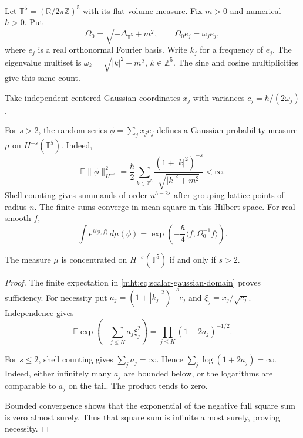 Let $\mathbb T^5=(\mathbb R/2\pi\mathbb Z)^5$ with its flat
volume measure. Fix $m>0$ and numerical $\hbar>0$. Put
\[
 \Omega_0=\sqrt{-\Delta_{\mathbb T^5}+m^2},
 \qquad \Omega_0e_j=\omega_je_j,
\]
where $e_j$ is a real orthonormal Fourier basis.
Write $k_j$ for a frequency of $e_j$.
The eigenvalue multiset is
$\omega_k=\sqrt{|k|^2+m^2}$, $k\in\mathbb Z^5$.
The sine and cosine multiplicities give this same count.

Take independent centered Gaussian coordinates $x_j$ with
variances $c_j=\hbar/(2\omega_j)$.

For $s>2$, the random series $\phi=\sum_jx_je_j$ defines
a Gaussian probability measure $\mu$ on $H^{-s}(\mathbb T^5)$.
Indeed,
\begin{equation}\label{mht:eq:scalar-gaussian-domain}
 \mathbb E\|\phi\|_{H^{-s}}^2
   =\frac\hbar2\sum_{k\in\mathbb Z^5}
       \frac{(1+|k|^2)^{-s}}{\sqrt{|k|^2+m^2}}<\infty.
\end{equation}
Shell counting gives summands of order $n^{3-2s}$ after
grouping lattice points of radius $n$. The finite sums converge
in mean square in this Hilbert space. For real smooth $f$,
\begin{equation}\label{mht:eq:scalar-characteristic-functional}
 \int e^{i\langle\phi,f\rangle}\,d\mu(\phi)
 =\exp\!\left(-\frac\hbar4
                       \langle f,\Omega_0^{-1}f\rangle\right).
\end{equation}

\begin{proposition}
\label{mht:prop:scalar-sobolev-threshold}
The measure $\mu$ is concentrated on $H^{-s}(\mathbb T^5)$
if and only if $s>2$.
\end{proposition}

\begin{proof}
The finite expectation in
\eqref{mht:eq:scalar-gaussian-domain} proves sufficiency.
For necessity put $a_j=(1+|k_j|^2)^{-s}c_j$ and
$\xi_j=x_j/\sqrt{c_j}$. Independence gives
\[
 \mathbb E\exp\!\left(-\sum_{j\leq K}a_j\xi_j^2\right)
       =\prod_{j\leq K}(1+2a_j)^{-1/2}.
\]

For $s\leq2$, shell counting gives $\sum_ja_j=\infty$.
Hence $\sum_j\log(1+2a_j)=\infty$. Indeed, either infinitely
many $a_j$ are bounded below, or the logarithms are comparable
to $a_j$ on the tail. The product tends to zero.

Bounded convergence shows that the exponential of the negative
full square sum is zero almost surely. Thus that square sum
is infinite almost surely, proving necessity.
\end{proof}

